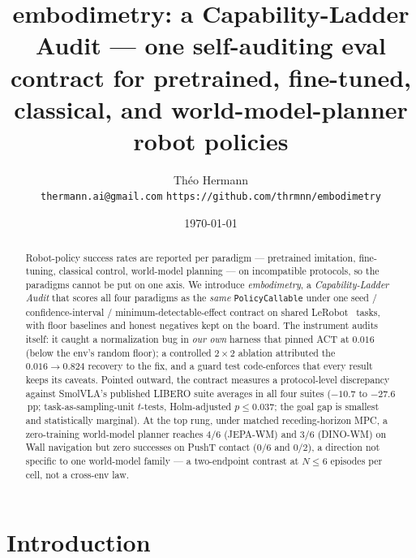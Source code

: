 \documentclass[10pt]{article}
\title{\vspace{-1.5ex}embodimetry: a Capability-Ladder Audit ---
one self-auditing eval contract for pretrained, fine-tuned, classical,
and world-model-planner robot policies\vspace{-0.5ex}}
\author{Th\'eo Hermann\\
\texttt{thermann.ai@gmail.com} \quad
\texttt{https://github.com/thrmnn/embodimetry}}
\date{\vspace{-2ex}\today\vspace{-1ex}}
\begin{document}
\maketitle


\begin{abstract}
Robot-policy success rates are reported per paradigm --- pretrained
imitation, fine-tuning, classical control, world-model planning --- on
incompatible protocols, so the paradigms cannot be put on one axis. We
introduce \emph{embodimetry}, a \emph{Capability-Ladder Audit} that scores
all four paradigms as the \emph{same} \texttt{PolicyCallable} under one
seed / confidence-interval / minimum-detectable-effect contract on shared
LeRobot~\cite{cadene2024lerobot} tasks, with floor baselines and honest
negatives kept on the board. The instrument audits itself: it caught a
normalization bug in \emph{our own} harness that pinned ACT at $0.016$
(below the env's random floor); a controlled $2{\times}2$ ablation
attributed the $0.016\to0.824$ recovery to the fix, and a guard test
code-enforces that every result keeps its caveats. Pointed outward, the
contract measures a protocol-level discrepancy against SmolVLA's published
LIBERO suite averages in all four suites ($-10.7$ to $-27.6$\,pp;
task-as-sampling-unit $t$-tests, Holm-adjusted $p\le0.037$; the goal gap
is smallest and statistically
marginal). At the top rung, under matched receding-horizon MPC, a
zero-training world-model planner reaches $4/6$ (JEPA-WM) and $3/6$
(DINO-WM) on Wall navigation but zero successes on PushT contact ($0/6$
and $0/2$), a direction not specific to one world-model
family --- a two-endpoint contrast at $N{\le}6$ episodes per cell, not a
cross-env law.
\end{abstract}


\section{Introduction}
\end{document}
